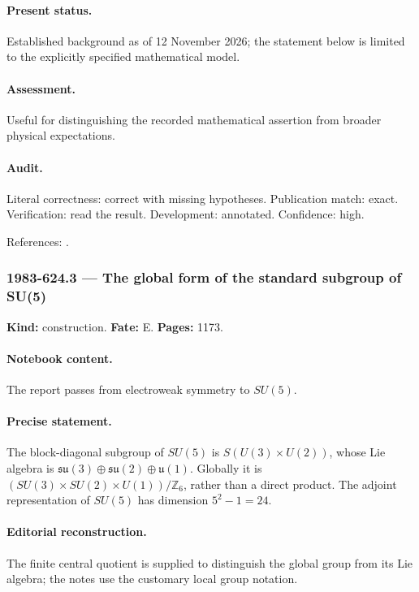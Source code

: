 \paragraph{Present status.} Established background as of 12 November 2026; the statement below is limited to the explicitly specified mathematical model.

\paragraph{Assessment.} Useful for distinguishing the recorded mathematical assertion from broader physical expectations.

\paragraph{Audit.} Literal correctness: correct with missing hypotheses. Publication match: exact. Verification: read the result. Development: annotated. Confidence: high.

\noindent References: \citep{weinberg1967leptons}.\par

\subsubsection{1983-624.3 --- The global form of the standard subgroup of SU(5)}

\label{item:1983-624.3}

\noindent\textbf{Kind:} construction. \textbf{Fate:} E. \textbf{Pages:} 1173.\par

\paragraph{Notebook content.} The report passes from electroweak symmetry to \(SU(5)\).

\paragraph{Precise statement.} The block-diagonal subgroup of \(SU(5)\) is \(S(U(3)\times U(2))\), whose Lie algebra is \(\mathfrak{su}(3)\oplus\mathfrak{su}(2)\oplus\mathfrak u(1)\). Globally it is \((SU(3)\times SU(2)\times U(1))/\mathbb Z_6\), rather than a direct product. The adjoint representation of \(SU(5)\) has dimension \(5^2-1=24\).

\paragraph{Editorial reconstruction.} The finite central quotient is supplied to distinguish the global group from its Lie algebra; the notes use the customary local group notation.

